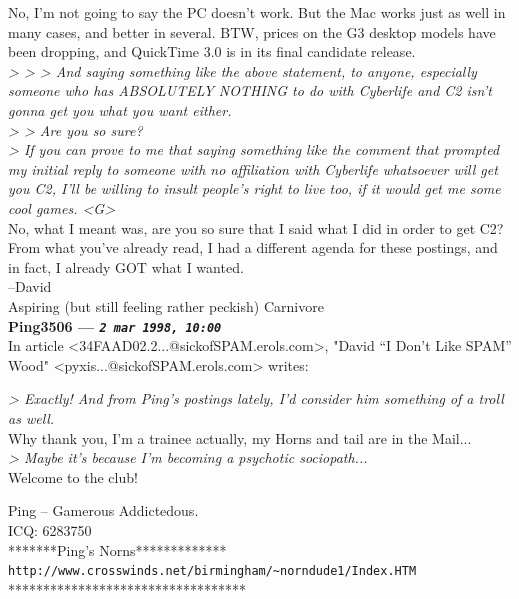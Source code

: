 \documentclass[11pt,twoside,a4paper]{article}
\begin{document}
\begin{multicols*}{2}
No, I'm not going to say the PC doesn't work. But the Mac works just as well in many cases, and better in several. BTW, prices on the G3 desktop models have been dropping, and QuickTime 3.0 is in its final candidate release.~\\

\emph{> > >  And saying something like the above statement, to anyone, especially someone who has ABSOLUTELY NOTHING to do with Cyberlife and C2 isn't gonna get you what you want either.}~\\

\emph{> > Are you so sure?}~\\

\emph{> If you can prove to me that saying something like the comment that prompted my initial reply to someone with no affiliation with Cyberlife whatsoever will get you C2, I'll be willing to insult people's right to live too, if it would get me some cool games.  <G>}~\\

No, what I meant was, are you so sure that I said what I did in order to get C2? From what you've already read, I had a different agenda for these postings, and in fact, I already GOT what I wanted.~\\

--David~\\
Aspiring (but still feeling rather peckish) Carnivore~\\

 
		
	
		
\textbf{Ping3506 --- \emph{\texttt{2 mar 1998, 10:00}}}~\\

In article <34FAAD02.2...@sickofSPAM.erols.com>, "David ``I Don't Like SPAM'' Wood" <pyxis...@sickofSPAM.erols.com> writes:

\emph{> Exactly! And from Ping's postings lately, I'd consider him something of a troll as well.}~\\

Why thank you, I'm a trainee actually, my Horns and tail are in the Mail...~\\

\emph{> Maybe it's because I'm becoming a psychotic sociopath...}~\\

Welcome to the club!

Ping -- Gamerous Addictedous.~\\
ICQ:  6283750~\\
*******Ping's Norns*************~\\
\texttt{http://www.crosswinds.net/birmingham/\textasciitilde norndude1/Index.HTM}~\\
**********************************~\\


\end{multicols*}
\end{document}
